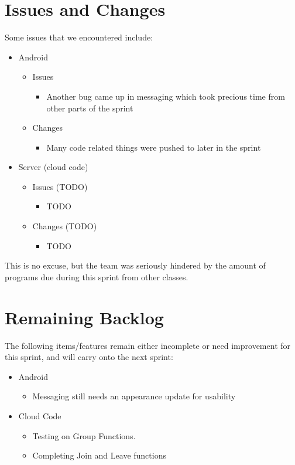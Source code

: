 \documentclass[11pt]{article}
\begin{document}
\section*{Issues and Changes}
Some issues that we encountered include:

	\begin{itemize}
		\item Android
			\begin{itemize}
				\item Issues
				\begin{itemize}
					\item Another bug came up in messaging which took precious time from other parts of the sprint
				\end{itemize}
				
				\item Changes
				\begin{itemize}
					\item Many code related things were pushed to later in the sprint
				\end{itemize}
			\end{itemize}
			
		\item Server (cloud code)
		\begin{itemize}
				\item Issues (TODO)
				\begin{itemize}
					\item TODO		
				\end{itemize}
				
				\item Changes (TODO)
				\begin{itemize}
					\item TODO
				\end{itemize}
			\end{itemize}
	\end{itemize}
	This is no excuse, but the team was seriously hindered by the amount of programs due during this sprint from other classes.\\

\section*{Remaining Backlog}
The following items/features remain either incomplete or need improvement for this sprint, and will carry onto the next sprint:
	\begin{itemize}
		\item Android
		\begin{itemize}
			\item Messaging still needs an appearance update for usability
		\end{itemize}
		\item Cloud Code
		\begin{itemize}
			\item Testing on Group Functions.
			\item Completing Join and Leave functions
		\end{itemize}
	\end{itemize}
\end{document}
